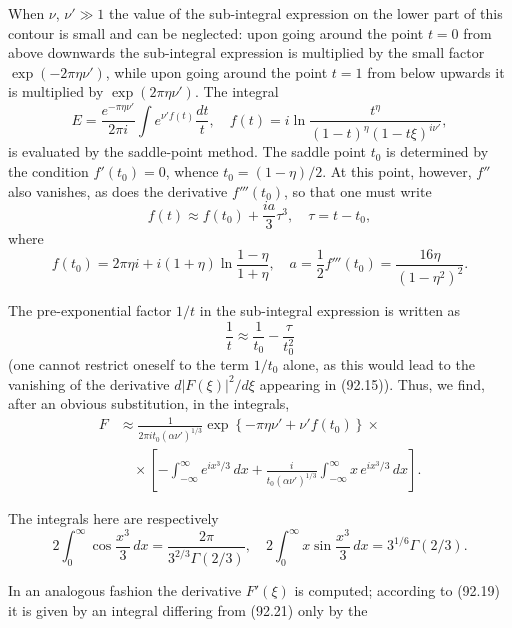 

When $\nu$, $\nu' \gg 1$ the value of the sub-integral expression on the lower part of this contour is small and can be neglected: upon going around the point $t = 0$ from above downwards the sub-integral expression is multiplied by the small factor $\exp(-2\pi\eta\nu')$, while upon going around the point $t = 1$ from below upwards it is multiplied by $\exp(2\pi\eta\nu')$. The integral
\[
E = \frac{e^{-\pi\eta\nu'}}{2\pi i}\int e^{\nu' f(t)}\frac{dt}{t}, \quad f(t) = i\ln\frac{t^\eta}{(1-t)^\eta(1-t\xi)^{i\nu'}},
\label{eq:92.21}
\]
is evaluated by the saddle-point method. The saddle point $t_0$ is determined by the condition $f'(t_0) = 0$, whence $t_0 = (1-\eta)/2$. At this point, however, $f''$ also vanishes, as does the derivative $f'''(t_0)$, so that one must write
\[
f(t) \approx f(t_0) + \frac{ia}{3}\tau^3, \quad \tau = t - t_0,
\]
where
\[
f(t_0) = 2\pi\eta i + i(1+\eta)\ln\frac{1-\eta}{1+\eta}, \quad a = \frac{1}{2}f'''(t_0) = \frac{16\eta}{(1-\eta^2)^2}.
\]

The pre-exponential factor $1/t$ in the sub-integral expression is written as
\[
\frac{1}{t} \approx \frac{1}{t_0} - \frac{\tau}{t_0^2}
\]
(one cannot restrict oneself to the term $1/t_0$ alone, as this would lead to the vanishing of the derivative $d|F(\xi)|^2/d\xi$ appearing in (92.15)). Thus, we find, after an obvious substitution, in the integrals,
\begin{equation}
\begin{split}
F &\approx \frac{1}{2\pi i t_0(\alpha\nu')^{1/3}}\exp\!\left\{-\pi\eta\nu' + \nu' f(t_0)\right\} \times {} \\
&\quad \times \left[-\int_{-\infty}^{\infty}e^{ix^3/3}\,dx + \frac{i}{t_0(\alpha\nu')^{1/3}}\int_{-\infty}^{\infty} x\,e^{ix^3/3}\,dx\right].
\end{split}
\label{eq:92.22}
\end{equation}

The integrals here are respectively
\[
2\int_0^\infty \cos\frac{x^3}{3}\,dx = \frac{2\pi}{3^{2/3}\Gamma(2/3)}, \quad 2\int_0^\infty x\sin\frac{x^3}{3}\,dx = 3^{1/6}\Gamma(2/3).
\]

In an analogous fashion the derivative $F'(\xi)$ is computed; according to (92.19) it is given by an integral differing from (92.21) only by the


